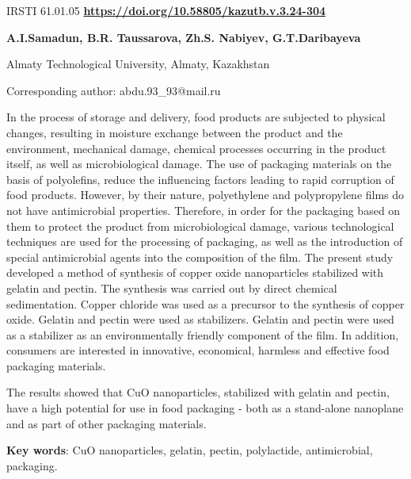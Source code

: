  \newpage
IRSTI 61.01.05
\hfill {\bfseries \href{https://doi.org/10.58805/kazutb.v.3.24-304}{https://doi.org/10.58805/kazutb.v.3.24-304}}


\begin{center}
{\bfseries A.I.Samadun\envelope, B.R. Taussarova, Zh.S. Nabiyev, G.T.Daribayeva}

Almaty Technological University, Almaty, Kazakhstan
\end{center}
\envelope Corresponding author: abdu.93\_93@mail.ru


In the process of storage and delivery, food products are subjected to
physical changes, resulting in moisture exchange between the product and
the environment, mechanical damage, chemical processes occurring in the
product itself, as well as microbiological damage. The use of packaging
materials on the basis of polyolefins, reduce the influencing factors
leading to rapid corruption of food products. However, by their nature,
polyethylene and polypropylene films do not have antimicrobial
properties. Therefore, in order for the packaging based on them to
protect the product from microbiological damage, various technological
techniques are used for the processing of packaging, as well as the
introduction of special antimicrobial agents into the composition of the
film. The present study developed a method of synthesis of copper oxide
nanoparticles stabilized with gelatin and pectin. The synthesis was
carried out by direct chemical sedimentation. Copper chloride was used
as a precursor to the synthesis of copper oxide. Gelatin and pectin were
used as stabilizers. Gelatin and pectin were used as a stabilizer as an
environmentally friendly component of the film. In addition, consumers
are interested in innovative, economical, harmless and effective food
packaging materials.

The results showed that CuO nanoparticles, stabilized with gelatin and
pectin, have a high potential for use in food packaging - both as a
stand-alone nanoplane and as part of other packaging materials.

{\bfseries Key words}: CuO nanoparticles, gelatin, pectin, polylactide,
antimicrobial, packaging.


